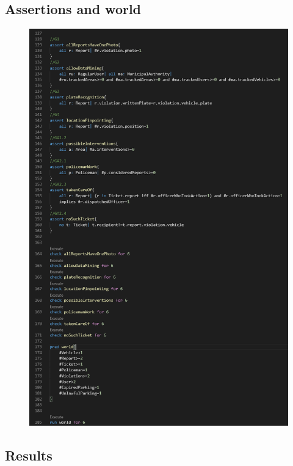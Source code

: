 \subsection{Assertions and world}
\begin{figure}[h!]
	\includegraphics[scale=0.60]{Images/Assertions_and_world}
\end{figure}
\newpage
\subsection{Results}
